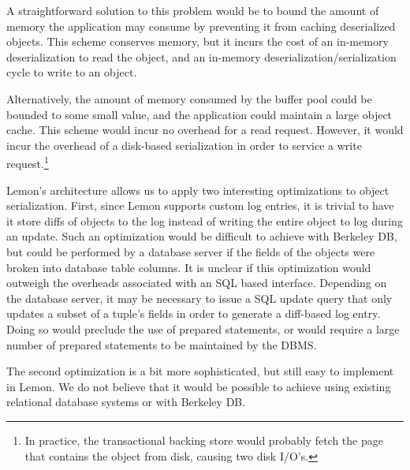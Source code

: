 \documentclass[letterpaper,twocolumn,english]{article}
\newcommand{\yad}{Lemon\xspace}
\begin{document}

A straightforward solution to this problem would be to bound
the amount of memory the application may consume by preventing it from
caching deserialized objects.  This scheme conserves memory, but it
incurs the cost of an in-memory deserialization to read the object,
and an in-memory deserialization/serialization cycle to write to an
object.

Alternatively, the amount of memory consumed by the buffer pool could
be bounded to some small value, and the application could maintain a
large object cache.  This scheme would incur no overhead for a read
request.  However, it would incur the overhead of a disk-based
serialization in order to service a write request.\footnote{In
practice, the transactional backing store would probably fetch the
page that contains the object from disk, causing two disk I/O's.}

\yad's architecture allows us to apply two interesting optimizations
to object serialization.  First, since \yad supports
custom log entries, it is trivial to have it store diffs of objects to
the log instead of writing the entire object to log during an update.
Such an optimization would be difficult to achieve with Berkeley DB,
but could be performed by a database server if the fields of the
objects were broken into database table columns.  It is unclear if
this optimization would outweigh the overheads associated with an SQL
based interface.  Depending on the database server, it may be
necessary to issue a SQL update query that only updates a subset of a
tuple's fields in order to generate a diff-based log entry.  Doing so
would preclude the use of prepared statements, or would require a large
number of prepared statements to be maintained by the DBMS.


The second optimization is a bit more sophisticated, but still easy to
implement in \yad.  We do not believe that it would be possible to
achieve using existing relational database systems or with Berkeley
DB.  
\end{document}
